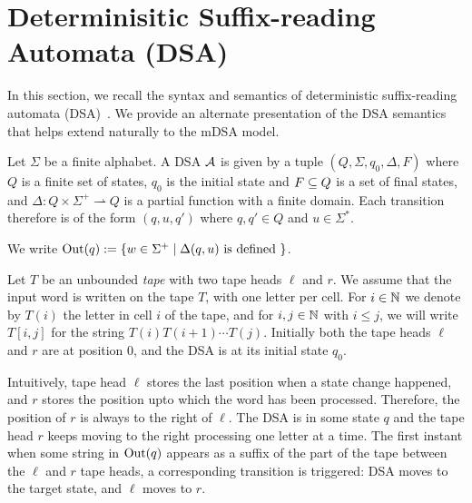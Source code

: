 \newcommand{\lt}{\ell}
\newcommand{\rt}{r}

\section{Determinisitic Suffix-reading Automata (DSA)}

In this section, we recall the syntax and semantics of deterministic suffix-reading automata (DSA)~\cite{DBLP:journals/corr/abs-2410-22761}. We provide an alternate presentation of the DSA semantics that helps extend naturally to the mDSA model.

\begin{definition}
Let $\Sigma$ be a finite alphabet. A DSA $\mathcal{A}$ is given by a tuple $(Q, \Sigma, q_0, \Delta, F)$ where $Q$ is a finite set of states, $q_0$ is the initial state and $F \subseteq Q$ is a set of final states, and $\Delta : Q \times \Sigma^+ \rightharpoonup Q$ is a  partial function with a finite domain. Each transition therefore is of the form $(q, u, q')$ where $q, q' \in Q$ and $u \in \Sigma^*$. 

We write $\operatorname{Out}(q) := \{ w \in \Sigma^+ \mid \Delta(q, u) \text{ is defined }\}$.
\end{definition}

 Let $T$ be an unbounded \emph{tape} with two tape heads $\lt$ and $\rt$. We assume that the input word is written on the tape $T$, with one letter per cell. For $i \in \mathbb{N}$ we denote by $T(i)$ the letter in cell $i$ of the tape, and for $i, j \in \mathbb{N}$ with $i \le j$, we will write $T[i, j]$ for the string $T(i) T(i+1) \cdots T(j)$. Initially both the tape heads $\lt$ and $\rt$ are at position $0$, and the DSA is at its initial state $q_0$.

Intuitively, tape head $\lt$ stores the last position when a state change happened, and $\rt$ stores the position upto which the word has been processed. Therefore, the position of $\rt$ is always to the right of $\lt$. The DSA is in some state $q$ and the tape head $\rt$ keeps moving to the right processing one letter at a time. The first instant when some string in $\operatorname{Out}(q)$ appears as a suffix of the part of the tape between the $\lt$ and $\rt$ tape heads, a corresponding transition is triggered: DSA moves to the target state, and $\lt$ moves to $\rt$. 

